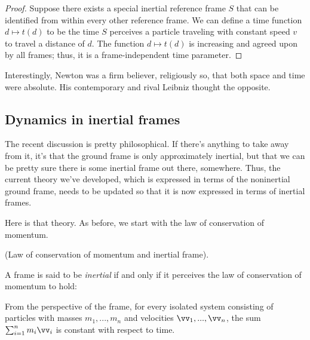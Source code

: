 \documentclass{article}
\begin{document}
\begin{proof}
	Suppose there exists a special inertial reference frame $S$ that can be identified from within every other reference frame. We can define a time function $d \mapsto t(d)$ to be the time $S$ perceives a particle traveling with constant speed $v$ to travel a distance of $d$. The function $d \mapsto t(d)$ is increasing and agreed upon by all frames; thus, it is a frame-independent time parameter.
\end{proof}

Interestingly, Newton was a firm believer, religiously so, that both space and time were absolute. His contemporary and rival Leibniz thought the opposite.

%
%
%

\subsection*{Dynamics in inertial frames}

The recent discussion is pretty philosophical. If there's anything to take away from it, it's that the ground frame is only approximately inertial, but that we can be pretty sure there is some inertial frame out there, somewhere. Thus, the current theory we've developed, which is expressed in terms of the noninertial ground frame, needs to be updated so that it is now expressed in terms of inertial frames.

Here is that theory. As before, we start with the law of conservation of momentum. 

\begin{defn}
	(Law of conservation of momentum and inertial frame).
	
	A frame is said to be \textit{inertial} if and only if it perceives the law of conservation of momentum to hold:
	
	\fullindent
	{
		From the perspective of the frame, for every isolated system consisting of particles with masses $m_1, ..., m_n$ and velocities $\vv_1, ..., \vv_n$, the sum $\sum_{i = 1}^n m_i \vv_i$ is constant with respect to time.
	}
\end{defn}
\end{document}
